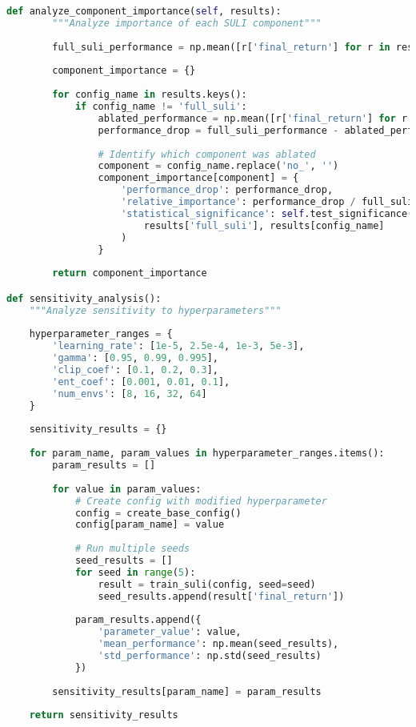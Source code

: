 \documentclass[12pt,a4paper]{article}
\begin{document}
\begin{lstlisting}[language=Python, caption=Comprehensive Ablation Studies]
    def analyze_component_importance(self, results):
        """Analyze importance of each SULI component"""
        
        full_suli_performance = np.mean([r['final_return'] for r in results['full_suli']])
        
        component_importance = {}
        
        for config_name in results.keys():
            if config_name != 'full_suli':
                ablated_performance = np.mean([r['final_return'] for r in results[config_name]])
                performance_drop = full_suli_performance - ablated_performance
                
                # Identify which component was ablated
                component = config_name.replace('no_', '')
                component_importance[component] = {
                    'performance_drop': performance_drop,
                    'relative_importance': performance_drop / full_suli_performance,
                    'statistical_significance': self.test_significance(
                        results['full_suli'], results[config_name]
                    )
                }
        
        return component_importance

def sensitivity_analysis():
    """Analyze sensitivity to hyperparameters"""
    
    hyperparameter_ranges = {
        'learning_rate': [1e-5, 2.5e-4, 1e-3, 5e-3],
        'gamma': [0.95, 0.99, 0.995],
        'clip_coef': [0.1, 0.2, 0.3],
        'ent_coef': [0.001, 0.01, 0.1],
        'num_envs': [8, 16, 32, 64]
    }
    
    sensitivity_results = {}
    
    for param_name, param_values in hyperparameter_ranges.items():
        param_results = []
        
        for value in param_values:
            # Create config with modified hyperparameter
            config = create_base_config()
            config[param_name] = value
            
            # Run multiple seeds
            seed_results = []
            for seed in range(5):
                result = train_suli(config, seed=seed)
                seed_results.append(result['final_return'])
            
            param_results.append({
                'parameter_value': value,
                'mean_performance': np.mean(seed_results),
                'std_performance': np.std(seed_results)
            })
        
        sensitivity_results[param_name] = param_results
    
    return sensitivity_results
\end{lstlisting}
\end{document}
